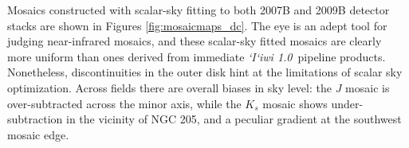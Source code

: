 \documentclass[iop]{emulateapj}
\newcommand{\sw}[1]{\textit{#1}} %
\newcommand{\iiwione}{\sw{`I`iwi 1.0}}
\begin{document}
Mosaics constructed with scalar-sky fitting to both 2007B and 2009B detector stacks are shown in Figures \ref{fig:mosaicmaps_dc}. The eye is an adept tool for judging near-infrared mosaics, and these scalar-sky fitted mosaics are clearly more uniform than ones derived from immediate \iiwione\ pipeline products. Nonetheless, discontinuities in the outer disk hint at the limitations of scalar sky optimization. Across fields there are overall biases in sky level: the $J$ mosaic is over-subtracted across the minor axis, while the $K_s$ mosaic shows under-subtraction in the vicinity of NGC 205, and a peculiar gradient at the southwest mosaic edge.


\end{document}
